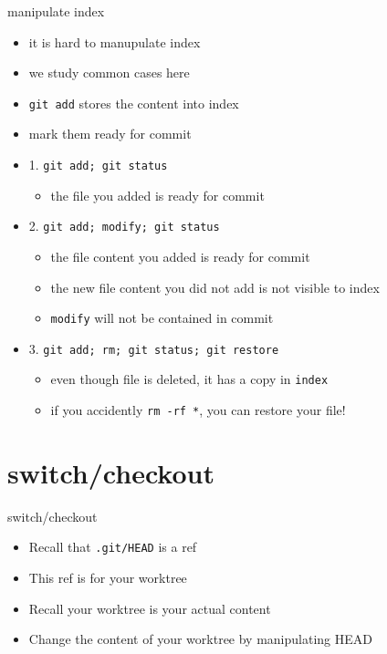 \documentclass[aspectratio=169]{beamer}
\newcommand{\T}[1]{\texttt{#1}}
\begin{document}
\begin{frame}{manipulate index}
  \begin{itemize}
    \item<1-> it is hard to manupulate index  
    \item<1-> we study common cases here
    \item<1-> \T{git add} stores the content into index
    \item<1-> mark them ready for commit
    \item<2-> 1. \T{git add; git status}\begin{itemize}
      \item the file you added is ready for commit
    \end{itemize}
    \item<3-> 2. \T{git add; modify; git status}\begin{itemize}
      \item the file content you added is ready for commit
      \item the new file content you did not add is not visible to index
      \item \T{modify} will not be contained in commit
    \end{itemize}
    \item<4-> 3. \T{git add; rm; git status; git restore}\begin{itemize}
      \item even though file is deleted, it has a copy in \T{index}
      \item if you accidently \T{rm -rf *}, you can restore your file! 
    \end{itemize}
  \end{itemize}
\end{frame}

\section{switch/checkout}
\begin{frame}{switch/checkout}
  \begin{itemize}
    \item Recall that \T{.git/HEAD} is a ref
    \item This ref is for your worktree
    \item Recall your worktree is your actual content
    \item Change the content of your worktree by manipulating HEAD
  \end{itemize}
\end{frame}
\end{document}
